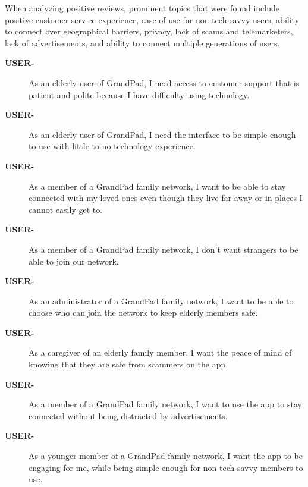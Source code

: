 When analyzing positive reviews, prominent topics that were found include
    positive customer service experience,
    ease of use for non-tech savvy users,
    ability to connect over geographical barriers,
    privacy,
    lack of scams and telemarketers,
    lack of advertisements,
    and ability to connect multiple generations of users.

\begin{description}
    \item[\textbf{USER-\showmycounter}]
        As an elderly user of GrandPad, I need access to customer support that
            is patient and polite because I have difficulty using technology.
    \item[\textbf{USER-\showmycounter}]
        As an elderly user of GrandPad, I need the interface to be simple enough
            to use with little to no technology experience.
    \item[\textbf{USER-\showmycounter}]
        As a member of a GrandPad family network, I want to be able to stay
            connected with my loved ones even though they live far away or in
            places I cannot easily get to.
    \item[\textbf{USER-\showmycounter}]
        As a member of a GrandPad family network, I don't want strangers to be
            able to join our network.
    \item[\textbf{USER-\showmycounter}]
        As an administrator of a GrandPad family network, I want to be able to
            choose who can join the network to keep elderly members safe.
    \item[\textbf{USER-\showmycounter}]
        As a caregiver of an elderly family member, I want the peace of mind of
            knowing that they are safe from scammers on the app.
    \item[\textbf{USER-\showmycounter}]
        As a member of a GrandPad family network, I want to use the app to stay
            connected without being distracted by advertisements.
    \item[\textbf{USER-\showmycounter}]
        As a younger member of a GrandPad family network, I want the app to be
            engaging for me, while being simple enough for non tech-savvy
            members to use.
\end{description}
